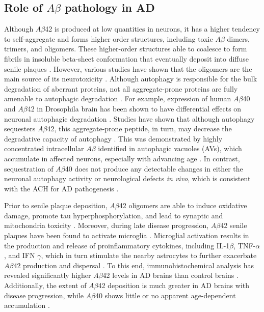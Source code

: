 \subsection{Role of $A\beta$ pathology in AD}
Although $A\beta$42 is produced at low quantities in neurons, it has a higher tendency to self-aggregate and forms higher order structures, including toxic $A\beta$ dimers, trimers, and oligomers. These higher-order structures able to coalesce to form fibrils in insoluble beta-sheet conformation that eventually deposit into diffuse senile plaques \citep{Burdick1992,Gravina1995}. However, various studies have shown that the oligomers are the main source of its neurotoxicity \citep{Shankar2008,Shankar2009}. Although autophagy is responsible for the bulk degradation of aberrant proteins, not all aggregate-prone proteins are fully amenable to autophagic degradation \citep{Wong2008}. For example, expression of human $A\beta$40 and $A\beta$42 in Drosophila brain has been shown to have differential effects on neuronal autophagic degradation \citep{Ling2009}. Studies have shown that although autophagy sequesters $A\beta$42, this aggregate-prone peptide, in turn, may decrease the degradative capacity of autophagy \citep{Ling2014,Ling2011}. This was demonstrated by highly concentrated intracellular $A\beta$ identified in autophagic vacuoles (AVs), which accumulate in affected neurons, especially with advancing age \citep{Ling2011}. In contrast, sequestration of $A\beta$40 does not produce any detectable changes in either the neuronal autophagy activity or neurological defects \textit{in vivo}, which is consistent with the ACH for AD pathogenesis \citep{Hardy1992}.

Prior to senile plaque deposition, $A\beta$42 oligomers are able to induce oxidative damage, promote tau hyperphosphorylation, and lead to synaptic and mitochondria toxicity \citep{Kaminsky2015,Lustbader2004}. Moreover, during late disease progression, $A\beta$42 senile plaques have been found to activate microglia \citep{Rosenmann2013}. Microglial activation results in the production and release of proinflammatory cytokines, including IL-1$\beta$, TNF-$\alpha$, and IFN $\gamma$, which in turn stimulate the nearby astrocytes to further exacerbate $A\beta$42 production and dispersal \citep{DalPra2015}. To this end, immunohistochemical analysis has revealed significantly higher $A\beta$42 levels in AD brains than control brains \citep{Funato1998}. Additionally, the extent of $A\beta$42 deposition is much greater in AD brains with disease progression, while $A\beta$40 shows little or no apparent age-dependent accumulation \citep{Funato1998}.

